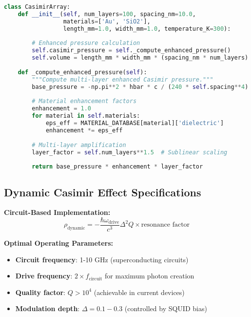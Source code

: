 \documentclass[11pt]{article}
\begin{document}
\begin{lstlisting}[language=Python]
class CasimirArray:
    def __init__(self, num_layers=100, spacing_nm=10.0, 
                 materials=['Au', 'SiO2'], 
                 length_mm=1.0, width_mm=1.0, temperature_K=300):
        
        # Enhanced pressure calculation
        self.casimir_pressure = self._compute_enhanced_pressure()
        self.volume = length_mm * width_mm * (spacing_nm * num_layers) * 1e-12
        
    def _compute_enhanced_pressure(self):
        """Compute multi-layer enhanced Casimir pressure."""
        base_pressure = -np.pi**2 * hbar * c / (240 * self.spacing**4)
        
        # Material enhancement factors
        enhancement = 1.0
        for material in self.materials:
            eps_eff = MATERIAL_DATABASE[material]['dielectric']
            enhancement *= eps_eff
        
        # Multi-layer amplification
        layer_factor = self.num_layers**1.5  # Sublinear scaling
        
        return base_pressure * enhancement * layer_factor
\end{lstlisting}

\subsection{Dynamic Casimir Effect Specifications}

\textbf{Circuit-Based Implementation:}
\begin{equation}
\rho_{\text{dynamic}} = -\frac{\hbar \omega_{\text{drive}}}{c^3} \Delta^2 Q \times \text{resonance factor}
\end{equation}

\textbf{Optimal Operating Parameters:}
\begin{itemize}
    \item \textbf{Circuit frequency}: 1-10 GHz (superconducting circuits)
    \item \textbf{Drive frequency}: $2 \times f_{\text{circuit}}$ for maximum photon creation
    \item \textbf{Quality factor}: $Q > 10^4$ (achievable in current devices)
    \item \textbf{Modulation depth}: $\Delta = 0.1-0.3$ (controlled by SQUID bias)
\end{itemize}
\end{document}
